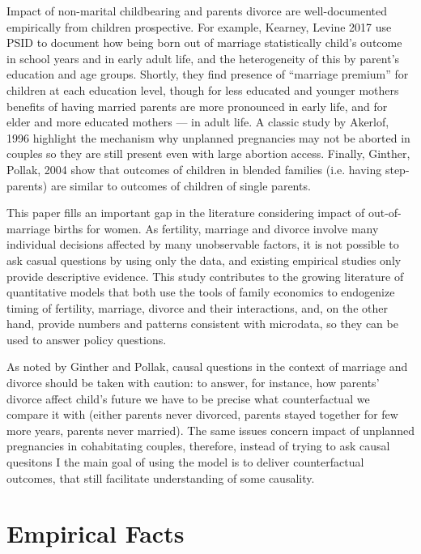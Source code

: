 \documentclass[12pt,letter]{article}
\begin{document}
Impact of non-marital childbearing and parents divorce are well-documented empirically from children prospective. For example, Kearney, Levine 2017 use PSID to document how being born out of marriage statistically child's outcome in school years and in early adult life, and the heterogeneity of this by parent's education and age groups. Shortly, they find presence of ``marriage premium'' for children at each education level, though for less educated and younger mothers benefits of having married parents are more pronounced in early life, and for elder and more educated mothers --- in adult life. A classic study by Akerlof, 1996\nocite{akerlof} highlight the mechanism why unplanned pregnancies may not be aborted in couples so they are still present even with large abortion access. Finally, Ginther, Pollak, 2004 show that outcomes of children in blended families (i.e. having step-parents) are similar to outcomes of children of single parents. 

This paper fills an important gap in the literature considering impact of out-of-marriage births for women. As fertility, marriage and divorce involve many individual decisions affected by many unobservable factors, it is not possible to ask casual questions by using only the data, and existing empirical studies only provide descriptive evidence. This study contributes to the growing literature of quantitative models that both use the tools of family economics to endogenize timing of fertility, marriage, divorce and their interactions, and, on the other hand, provide numbers and patterns consistent with microdata, so they can be used to answer policy questions.

As noted by Ginther and Pollak, causal questions in the context of marriage and divorce should be taken with caution: to answer, for instance, how parents' divorce affect child's future we have to be precise what counterfactual we compare it with (either parents never divorced, parents stayed together for few more years, parents never married). The same issues concern impact of unplanned pregnancies in cohabitating couples, therefore, instead of trying to ask causal quesitons I the main goal of using the model is to deliver counterfactual outcomes, that still facilitate understanding of some causality.

\section{Empirical Facts}
\end{document}
